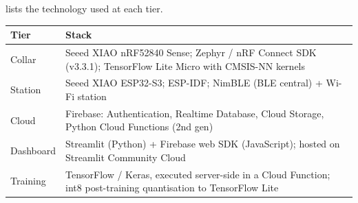  lists the technology used at each tier.

\begin{center}
  \label{tab:stack}
  \begin{tabularx}{\textwidth}{@{}lX@{}}
    \toprule
    \textbf{Tier} & \textbf{Stack} \\
    \midrule
    Collar    & Seeed XIAO nRF52840 Sense; Zephyr / nRF Connect SDK (v3.3.1); TensorFlow Lite Micro
                with CMSIS-NN kernels \\
    Station   & Seeed XIAO ESP32-S3; ESP-IDF; NimBLE (BLE central) + Wi-Fi station \\
    Cloud     & Firebase: Authentication, Realtime Database, Cloud Storage, Python Cloud Functions
                (2nd gen) \\
    Dashboard & Streamlit (Python) + Firebase web SDK (JavaScript); hosted on Streamlit Community
                Cloud \\
    Training  & TensorFlow / Keras, executed server-side in a Cloud Function; int8 post-training
                quantisation to TensorFlow Lite \\
    \bottomrule
  \end{tabularx}
\end{center}
